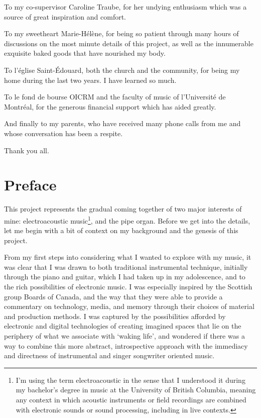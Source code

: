 \documentclass[12pt,twoside,maitrise]{dms_ks}
\theoremstyle{definition}
\begin{document}
To my co-supervisor Caroline Traube, for her undying enthusiasm which was a source of great inspiration and comfort.

To my sweetheart Marie-Hélène, for being so patient through many hours of discussions on the most minute details of this project, as well as the innumerable exquisite baked goods that have nourished my body.

To l'église Saint-Édouard, both the church and the community, for being my home during the last two years. I have learned so much.

To le fond de bourse OICRM and the faculty of music of l'Université de Montréal, for the generous financial support which has aided greatly.

And finally to my parents, who have received many phone calls from me and whose conversation has been a respite.

Thank you all.


\NoChapterPageNumber
\cleardoublepage
{}


\chapter*{Preface}


This project represents the gradual coming together of two major interests of mine: electroacoustic music\footnote{I'm using the term electroacoustic in the sense that I understood it during my bachelor's degree in music at the University of British Columbia, meaning any context in which acoustic instruments or field recordings are combined with electronic sounds or sound processing, including in live contexts.}, and the pipe organ. 
Before we get into the details, let me begin with a bit of context on my background and the genesis of this project.

From my first steps into considering what I wanted to explore with my music, it was clear that I was drawn to both traditional instrumental technique, initially through the piano and guitar, which I had taken up in my adolescence, and to the rich possibilities of electronic music. 
I was especially inspired by the Scottish group Boards of Canada, and the way that they were able to provide a commentary on technology, media, and memory through their choices of material and production methods. 
I was captured by the possibilities afforded by electronic and digital technologies of creating imagined spaces that lie on the periphery of what we associate with `waking life', and wondered if there was a way to combine this more abstract, introspective approach with the immediacy and directness of instrumental and singer songwriter oriented music.
\end{document}
